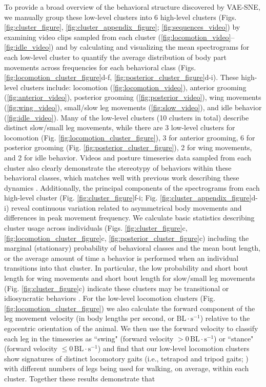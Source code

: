\documentclass[11pt,a4paper,twoside]{book}
\begin{document}
\begin{doublespace}
To provide a broad overview of the behavioral structure discovered by VAE-SNE, we manually group these low-level clusters into 6 high-level clusters (Figs. \ref{fig:cluster_figure}, \ref{fig:cluster_appendix_figure}; \ref{fig:sequences_video}) by examining video clips sampled from each cluster (\ref{fig:locomotion_video}--\ref{fig:idle_video}) and by calculating and visualizing the mean spectrograms for each low-level cluster to quantify the average distribution of body part movements across frequencies for each behavioral class (Figs. \ref{fig:locomotion_cluster_figure}d-f, \ref{fig:posterior_cluster_figure}d-i). These high-level clusters include: locomotion (\ref{fig:locomotion_video}), anterior grooming (\ref{fig:anterior_video}), posterior grooming (\ref{fig:posterior_video}), wing movements (\ref{fig:wing_video}), small/slow leg movements (\ref{fig:slow_video}), and idle behavior (\ref{fig:idle_video}). Many of the low-level clusters (10 clusters in total) describe distinct slow/small leg movements, while there are 3 low-level clusters for locomotion (Fig. \ref{fig:locomotion_cluster_figure}), 3 for anterior grooming, 6 for posterior grooming (Fig. \ref{fig:posterior_cluster_figure}), 2 for wing movements, and 2 for idle behavior. Videos and posture timeseries data sampled from each cluster also clearly demonstrate the stereotypy of behaviors within these behavioral classes, which matches well with previous work describing these dynamics \citep{berman2014mapping, berman2016predictability, klibaite2017unsupervised, klibaite2019interacting, pereira2019fast}. Additionally, the principal components of the spectrograms from each high-level cluster (Fig. \ref{fig:cluster_figure}f-i; Fig. \ref{fig:cluster_appendix_figure}d-i) reveal continuous variation related to asymmetrical body movements and differences in peak movement frequency. We calculate basic statistics describing cluster usage across individuals (Figs. \ref{fig:cluster_figure}c, \ref{fig:locomotion_cluster_figure}c, \ref{fig:posterior_cluster_figure}c) including the marginal (stationary) probability of behavioral classes and the mean bout length, or the average amount of time a behavior is performed when an individual transitions into that cluster. In particular, the low probability and short bout length for wing movements and short bout length for slow/small leg movements (Fig. \ref{fig:cluster_figure}c) indicate these clusters may be transitional or idiosyncratic behaviors \citep{todd2017systematic}. For the low-level locomotion clusters (Fig. \ref{fig:locomotion_cluster_figure}) we also calculate the forward component of the leg movement velocity (in body lengths per second, or $\textrm{BL} \cdot \textrm{s}^{-1}$) relative to the egocentric orientation of the animal. We then use the forward velocity to classify each leg in the timeseries as ``swing" (forward velocity $> 0 \, \textrm{BL} \cdot \textrm{s}^{-1}$) or ``stance" (forward velocity $\leq 0 \, \textrm{BL} \cdot \textrm{s}^{-1}$) and find that our low-level locomotion clusters show signatures of distinct locomotory gaits (i.e., tetrapod and tripod gaits; \citealt{mendes2013quantification, pereira2019fast}) with different numbers of legs being used for walking, on average, within each cluster. Together these results demonstrate that 
\end{doublespace}
\end{document}
